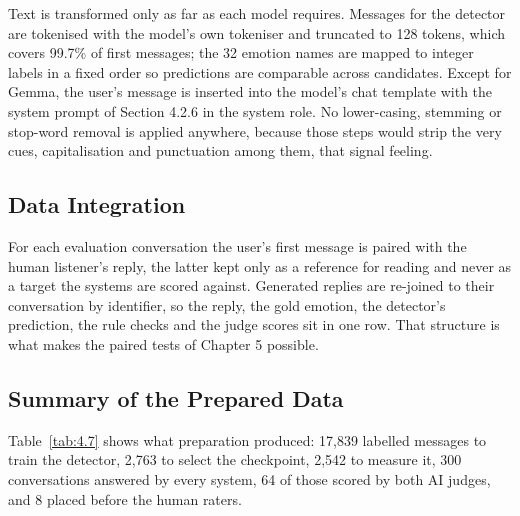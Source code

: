 Text is transformed only as far as each model requires. Messages for the detector are tokenised with the model's own tokeniser and truncated to 128 tokens, which covers 99.7\% of first messages; the 32 emotion names are mapped to integer labels in a fixed order so predictions are comparable across candidates. Except for Gemma, the user's message is inserted into the model's chat template with the system prompt of Section 4.2.6 in the system role. No lower-casing, stemming or stop-word removal is applied anywhere, because those steps would strip the very cues, capitalisation and punctuation among them, that signal feeling.

\subsection{Data Integration}

For each evaluation conversation the user's first message is paired with the human listener's reply, the latter kept only as a reference for reading and never as a target the systems are scored against. Generated replies are re-joined to their conversation by identifier, so the reply, the gold emotion, the detector's prediction, the rule checks and the judge scores sit in one row. That structure is what makes the paired tests of Chapter 5 possible.

\subsection{Summary of the Prepared Data}

Table~\ref{tab:4.7} shows what preparation produced: 17,839 labelled messages to train the detector, 2,763 to select the checkpoint, 2,542 to measure it, 300 conversations answered by every system, 64 of those scored by both AI judges, and 8 placed before the human raters.

